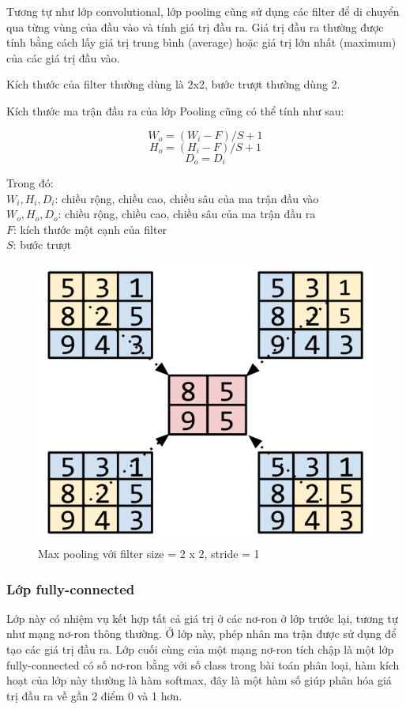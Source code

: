 \documentclass[a4paper,14pt]{extreport}
\begin{document}
Tương tự như lớp convolutional, lớp pooling cũng sử dụng các filter để di chuyển qua từng vùng của đầu vào và tính giá trị đầu ra. Giá trị đầu ra thường được tính bằng cách lấy giá trị trung bình (average) hoặc giá trị lớn nhất (maximum) của các giá trị đầu vào.

Kích thước của filter thường dùng là 2x2, bước trượt thường dùng 2.

Kích thước ma trận đầu ra của lớp Pooling cũng có thể tính như sau:

\[ W_o = (W_i - F) / S + 1 \]
\[ H_o = (H_i - F) / S + 1 \]
\[ D_o = D_i \]

Trong đó: \\
$ W_i, H_i, D_i $: chiều rộng, chiều cao, chiều sâu của ma trận đầu vào \\
$ W_o, H_o, D_o $: chiều rộng, chiều cao, chiều sâu của ma trận đầu ra \\
$ F $: kích thước một cạnh của filter \\
$ S $: bước trượt \\

\begin{figure}  
    \centering
    \includegraphics[scale=0.7]{img/maxpooling.png}
    \caption{Max pooling với filter size = 2 x 2, stride = 1}
\end{figure}

\subsubsection*{Lớp fully-connected}
Lớp này có nhiệm vụ kết hợp tất cả giá trị ở các nơ-ron ở lớp trước lại, tương tự như mạng nơ-ron thông thường. 
Ở lớp này, phép nhân ma trận được sử dụng để tạo các giá trị đầu ra. Lớp cuối cùng của một mạng nơ-ron tích 
chập là một lớp fully-connected có số nơ-ron bằng với số class trong bài toán phân loại, hàm kích hoạt của 
lớp này thường là hàm softmax, đây là một hàm số giúp phân hóa giá trị đầu ra về gần 2 điểm 0 và 1 hơn.
\end{document}
